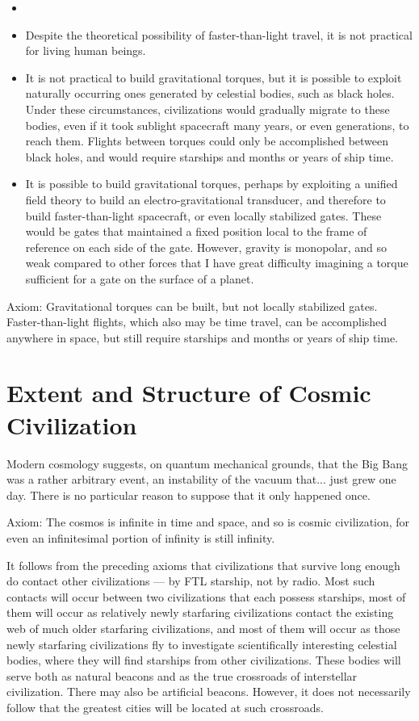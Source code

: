 \documentclass[english,11pt,letterpaper,onecolumn]{scrbook}
\begin{document}
\begin{itemize}
	\item 
\item	Despite the theoretical possibility of faster-than-light travel, it is not practical for living human beings.

\item	It is not practical to build gravitational torques, but it is possible to exploit naturally occurring ones generated by celestial bodies, such as black holes.  Under these circumstances, civilizations would gradually migrate to these bodies, even if it took sublight spacecraft many years, or even generations, to reach them.  Flights between torques could only be accomplished between black holes, and would require starships and months or years of ship time.

\item	It is possible to build gravitational torques, perhaps by exploiting a unified field theory to build an electro-gravitational transducer, and therefore to build faster-than-light spacecraft, or even locally stabilized gates.  These would be gates that maintained a fixed position local to the frame of reference on each side of the gate.  However, gravity is monopolar, and so weak compared to other forces that I have great difficulty imagining a torque sufficient for a gate on the surface of a planet.
\end{itemize}

Axiom:	Gravitational torques can be built, but not locally stabilized gates.  Faster-than-light flights, which also may be time travel, can be accomplished anywhere in space, but still require starships and months or years of ship time.

\section{Extent and Structure of Cosmic Civilization}

Modern cosmology suggests, on quantum mechanical grounds, that the Big Bang was a rather arbitrary event, an instability of the vacuum that... just grew one day.  There is no particular reason to suppose that it only happened once.

Axiom:	The cosmos is infinite in time and space, and so is cosmic civilization, for even an infinitesimal portion of infinity is still infinity.

It follows from the preceding axioms that civilizations that survive long enough do contact other civilizations ---  by FTL starship, not by radio.  Most such contacts will occur between two civilizations that each possess starships, most of them will occur as relatively newly starfaring civilizations contact the existing web of much older starfaring civilizations, and most of them will occur as those newly starfaring civilizations fly to investigate scientifically interesting celestial bodies, where they will find starships from other civilizations.  These bodies will serve both as natural beacons and as the true crossroads of interstellar civilization.  There may also be artificial beacons.  However, it does not necessarily follow that the greatest cities will be located at such crossroads.
\end{document}
